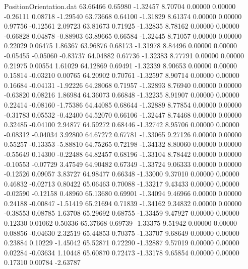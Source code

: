 \begin{filecontents}{PositionOrientation.dat}
  63.66466    0.65980   -1.32457     8.70704    0.00000    0.00000   -0.26111    0.08718   -1.29540
  63.73668    0.64100   -1.31829     8.61374    0.00000    0.00000    0.97756   -0.12561    2.09723
  63.81673    0.71925   -1.32835     8.78162    0.00000    0.00000   -0.66828    0.04878   -0.88903
  63.89665    0.66584   -1.32445     8.71057    0.00000    0.00000    0.22029    0.06475    1.86367
  63.96876    0.68173   -1.31978     8.84496    0.00000    0.00000   -0.05455   -0.05060   -0.83737
  64.04882    0.67736   -1.32383     8.77791    0.00000    0.00000    0.21975    0.00554    1.61029
  64.12869    0.69491   -1.32339     8.90653    0.00000    0.00000    0.15814   -0.03210    0.00765
  64.20902    0.70761   -1.32597     8.90714    0.00000    0.00000    0.16684   -0.04131   -1.92226
  64.28068    0.71957   -1.32893     8.76940    0.00000    0.00000   -0.63820    0.08216    1.86984
  64.36073    0.66848   -1.32235     8.91907    0.00000    0.00000    0.22414   -0.08160   -1.75386
  64.44085    0.68644   -1.32889     8.77854    0.00000    0.00000   -0.31783    0.05532   -0.42400
  64.52070    0.66106   -1.32447     8.74468    0.00000    0.00000    0.32485   -0.04100    2.94877
  64.59272    0.68446   -1.32742     8.95706    0.00000    0.00000   -0.08312   -0.04034    3.92800
  64.67272    0.67781   -1.33065     9.27126    0.00000    0.00000    0.55257   -0.13353   -5.88810
  64.75265    0.72198   -1.34132     8.80060    0.00000    0.00000   -0.55649    0.14300   -0.22488
  64.82457    0.68196   -1.33104     8.78442    0.00000    0.00000   -0.10553   -0.07729    3.47549
  64.90482    0.67349   -1.33724     9.06333    0.00000    0.00000   -0.12526    0.09057    3.83727
  64.98477    0.66348   -1.33000     9.37010    0.00000    0.00000    0.46832   -0.02713    0.80422
  65.06463    0.70088   -1.33217     9.43433    0.00000    0.00000   -0.02590   -0.12158    0.48960
  65.13680    0.69901   -1.34094     9.46966    0.00000    0.00000    0.24188   -0.00847   -1.51419
  65.21694    0.71839   -1.34162     9.34832    0.00000    0.00000   -0.38553    0.08785    1.63708
  65.29692    0.68755   -1.33459     9.47927    0.00000    0.00000    0.12330    0.01062    0.50336
  65.37668    0.69739   -1.33375     9.51942    0.00000    0.00000    0.08856   -0.04630    2.32519
  65.44853    0.70375   -1.33707     9.68649    0.00000    0.00000    0.23884    0.10229   -1.45042
  65.52871    0.72290   -1.32887     9.57019    0.00000    0.00000    0.02284   -0.03634    1.10448
  65.60870    0.72473   -1.33178     9.65854    0.00000    0.00000    0.17310    0.00784   -2.63787

\end{filecontents}
